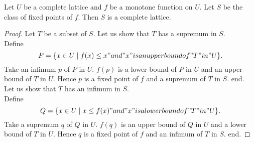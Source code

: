 \documentclass{article}
\begin{document}
  \begin{forthel}

    \begin{theorem}[KnasterTarski]
      Let $U$ be a complete lattice and $f$ be a monotone function on $U$.
      Let $S$ be the class of fixed points of $f$. Then $S$ is a complete lattice.
    \end{theorem}
    \begin{proof}
      Let $T$ be a subset of $S$.
      Let us show that $T$ has a supremum in $S$. \\
        Define 
        \[
          P = \{x \in U \mid f(x) \leq x "and" x "is an upper bound of" T "in" U\} .
        \]
        Take an infimum $p$ of $P$ in $U$. $f(p)$ is a lower bound of $P$ in $U$ and an upper bound of $T$ in $U$.
        Hence $p$ is a fixed point of $f$ and a supremum of $T$ in $S$.
      end. \\
      Let us show that $T$ has an infimum in $S$. \\
        Define 
        \[
          Q = \{x \in U \mid x \leq f(x) "and" x "is a lower bound of" T "in" U\} .
        \]
        Take a supremum $q$ of $Q$ in $U$. $f(q)$ is an upper bound of $Q$ in $U$ and a lower bound of $T$ in $U$.
        Hence $q$ is a fixed point of $f$ and an infimum of $T$ in $S$.
      end.
    \end{proof}
  \end{forthel}
\end{document}
